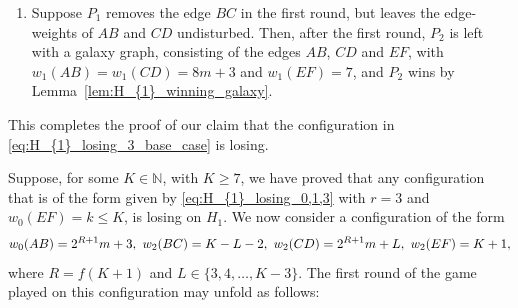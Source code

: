 \documentclass[11pt,reqno]{amsart}
\theoremstyle{definition}
\theoremstyle{definition}
\begin{document}
\begin{enumerate}
\item Suppose $P_{1}$ removes the edge $BC$ in the first round, but leaves the edge-weights of $AB$ and $CD$ undisturbed. Then, after the first round, $P_{2}$ is left with a galaxy graph, consisting of the edges $AB$, $CD$ and $EF$, with $w_{1}(AB)=w_{1}(CD)=8m+3$ and $w_{1}(EF)=7$, and $P_{2}$ wins by Lemma~\ref{lem:H_{1}_winning_galaxy}. 
\end{enumerate}
This completes the proof of our claim that the configuration in \eqref{eq:H_{1}_losing_3_base_case} is losing.

Suppose, for some $K \in \mathbb{N}$, with $K \geqslant 7$, we have proved that any configuration that is of the form given by \eqref{eq:H_{1}_losing_0,1,3} with $r=3$ and $w_{0}(EF)=k \leqslant K$, is losing on $H_{1}$. We now consider a configuration of the form
\begin{equation}
w_{0}(AB)=2^{R+1}m+3,\ w_{2}(BC)=K-L-2,\ w_{2}(CD)=2^{R+1}m+L,\ w_{2}(EF)=K+1,\label{eq:H_{1}_losing_3_inductive}
\end{equation}
where $R=f(K+1)$ and $L \in \{3,4,\ldots,K-3\}$. The first round of the game played on this configuration may unfold as follows:
\end{document}
